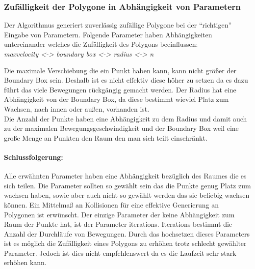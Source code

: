\subsubsection{Zufälligkeit der Polygone in Abhängigkeit von Parametern}
Der Algorithmus generiert zuverlässig zufällige Polygone bei der \enquote{richtigen} Eingabe von Parametern. Folgende Parameter haben Abhängigkeiten untereinander welches die Zufälligkeit des Polygons beeinflussen:\\
\textit{maxvelocity <-> boundary box <-> radius <-> n}

Die maximale Verschiebung die ein Punkt haben kann, kann nicht größer der Boundary Box sein. Deshalb ist es nicht effektiv diese höher zu setzen da es dazu führt das viele Bewegungen rückgängig gemacht werden.
Der Radius hat eine Abhängigkeit von der Boundary Box, da diese bestimmt wieviel Platz zum Wachsen, nach innen oder außen, vorhanden ist.\\
Die Anzahl der Punkte haben eine Abhängigkeit zu dem Radius und damit auch zu der maximalen Bewegungsgeschwindigkeit und der Boundary Box weil eine große Menge an Punkten den Raum den man sich teilt einschränkt.
\paragraph{Schlussfolgerung:}
Alle erwähnten Parameter haben eine Abhängigkeit bezüglich des Raumes die es sich teilen. Die Parameter sollten so gewählt sein das die Punkte genug Platz zum wachsen haben, sowie aber auch nicht so gewählt werden das sie beliebig wachsen können. Ein Mittelmaß an Kollisionen für eine effektive Generierung an Polygonen ist erwünscht.
Der einzige Parameter der keine Abhängigkeit zum Raum der Punkte hat, ist der Parameter iterations. Iterations bestimmt die Anzahl der Durchläufe von Bewegungen. Durch das hochsetzen dieses Parameters ist es möglich die Zufälligkeit eines Polygons zu erhöhen trotz schlecht gewählter Parameter. Jedoch ist dies nicht empfehlenswert da es die Laufzeit sehr stark erhöhen kann.  

	
